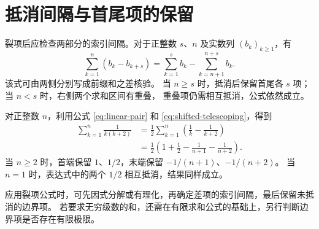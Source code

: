 \documentclass[UTF8]{ctexart}
\begin{document}
\section{抵消间隔与首尾项的保留}

裂项后应检查两部分的索引间隔。对于正整数 $s$、$n$ 及实数列 $(b_k)_{k\ge1}$，有
\begin{equation}\label{eq:shifted-telescoping}
  \sum_{k=1}^{n}(b_k-b_{k+s})
  =\sum_{k=1}^{s}b_k-\sum_{k=n+1}^{n+s}b_k.
\end{equation}
该式可由两侧分别写成前缀和之差核验。
当 $n\ge s$ 时，抵消后保留首尾各 $s$ 项；当 $n<s$ 时，右侧两个求和区间有重叠，
重叠项仍需相互抵消，公式依然成立。

\begin{example}[间隔为二的裂项]
对正整数 $n$，利用公式 \eqref{eq:linear-pair} 和 \eqref{eq:shifted-telescoping}，得到
\begin{align*}
  \sum_{k=1}^{n}\frac1{k(k+2)}
  &=\frac12\sum_{k=1}^{n}\left(\frac1k-\frac1{k+2}\right)\\
  &=\frac12\left(1+\frac12-\frac1{n+1}-\frac1{n+2}\right).
\end{align*}
当 $n\ge2$ 时，首端保留 $1$、$1/2$，末端保留 $-1/(n+1)$、$-1/(n+2)$。
当 $n=1$ 时，表达式中的两个 $1/2$ 相互抵消，结果同样成立。
\end{example}

应用裂项公式时，可先因式分解或有理化，再确定差项的索引间隔，最后保留未抵消的边界项。
若要求无穷级数的和，还需在有限求和公式的基础上，另行判断边界项是否存在有限极限。
\end{document}
